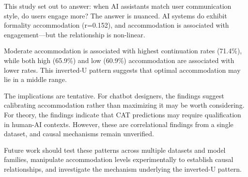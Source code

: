 
This study set out to answer: when AI assistants match user communication style, do users engage more? The answer is nuanced. AI systems do exhibit formality accommodation (r=0.152), and accommodation is associated with engagement---but the relationship is non-linear.

Moderate accommodation is associated with highest continuation rates (71.4\%), while both high (65.9\%) and low (60.9\%) accommodation are associated with lower rates. This inverted-U pattern suggests that optimal accommodation may lie in a middle range.

The implications are tentative. For chatbot designers, the findings suggest calibrating accommodation rather than maximizing it may be worth considering. For theory, the findings indicate that CAT predictions may require qualification in human-AI contexts. However, these are correlational findings from a single dataset, and causal mechanisms remain unverified.

Future work should test these patterns across multiple datasets and model families, manipulate accommodation levels experimentally to establish causal relationships, and investigate the mechanism underlying the inverted-U pattern.


